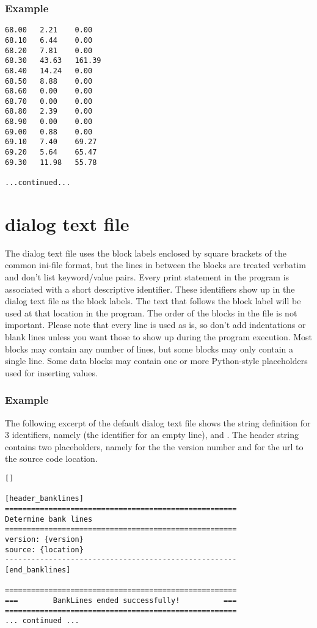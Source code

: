 \subsubsection*{Example}

\begin{Verbatim}
68.00   2.21    0.00
68.10   6.44    0.00
68.20   7.81    0.00
68.30   43.63   161.39
68.40   14.24   0.00
68.50   8.88    0.00
68.60   0.00    0.00
68.70   0.00    0.00
68.80   2.39    0.00
68.90   0.00    0.00
69.00   0.88    0.00
69.10   7.40    69.27
69.20   5.64    65.47
69.30   11.98   55.78

...continued...
\end{Verbatim}

\section{dialog text file}

The dialog text file uses the block labels enclosed by square brackets of the common ini-file format, but the lines in between the blocks are treated verbatim and don't list keyword/value pairs.
Every print statement in the program is associated with a short descriptive identifier.
These identifiers show up in the dialog text file as the block labels.
The text that follows the block label will be used at that location in the program.
The order of the blocks in the file is not important.
Please note that every line is used as is, so don't add indentations or blank lines unless you want those to show up during the program execution.
Most blocks may contain any number of lines, but some blocks may only contain a single line.
Some data blocks may contain one or more Python-style placeholders used for inserting values.

\subsubsection*{Example}

The following excerpt of the default  dialog text file shows the string definition for 3 identifiers, namely  (the identifier for an empty line),  and .
The header string contains two placeholders, namely  for the the version number and  for the url to the source code location.

\begin{Verbatim}
[]

[header_banklines]
=====================================================
Determine bank lines
=====================================================
version: {version}
source: {location}
-----------------------------------------------------
[end_banklines]

=====================================================
===        BankLines ended successfully!          ===
=====================================================
... continued ...
\end{Verbatim}
